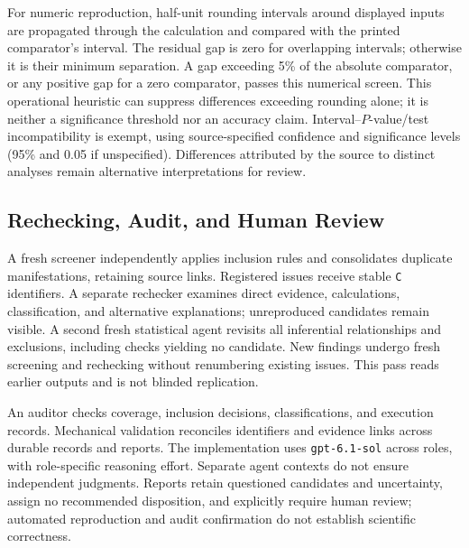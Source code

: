 \documentclass[12pt,a4paper]{article}
\begin{document}
For numeric reproduction, half-unit rounding intervals around displayed inputs are propagated through the calculation and compared with the printed comparator's interval. The residual gap is zero for overlapping intervals; otherwise it is their minimum separation. A gap exceeding 5\% of the absolute comparator, or any positive gap for a zero comparator, passes this numerical screen. This operational heuristic can suppress differences exceeding rounding alone; it is neither a significance threshold nor an accuracy claim. Interval--\(P\)-value/test incompatibility is exempt, using source-specified confidence and significance levels (95\% and 0.05 if unspecified). Differences attributed by the source to distinct analyses remain alternative interpretations for review.

\subsection{Rechecking, Audit, and Human Review}
\label{sec:framework-audit}
\label{sec:framework-report}

A fresh screener independently applies inclusion rules and consolidates duplicate manifestations, retaining source links. Registered issues receive stable \texttt{C} identifiers. A separate rechecker examines direct evidence, calculations, classification, and alternative explanations; unreproduced candidates remain visible. A second fresh statistical agent revisits all inferential relationships and exclusions, including checks yielding no candidate. New findings undergo fresh screening and rechecking without renumbering existing issues. This pass reads earlier outputs and is not blinded replication.

An auditor checks coverage, inclusion decisions, classifications, and execution records. Mechanical validation reconciles identifiers and evidence links across durable records and reports. The implementation uses \texttt{gpt-6.1-sol} across roles, with role-specific reasoning effort. Separate agent contexts do not ensure independent judgments. Reports retain questioned candidates and uncertainty, assign no recommended disposition, and explicitly require human review; automated reproduction and audit confirmation do not establish scientific correctness.

\end{document}
